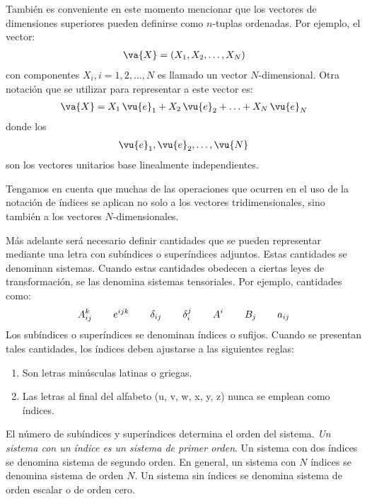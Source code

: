 \par
También es conveniente en este momento mencionar que los vectores de dimensiones superiores pueden definirse como $n$-tuplas ordenadas. Por ejemplo, el vector:
\begin{align*}
\va{X} = (X_{1}, X_{2}, \ldots, X_{N})
\end{align*}
con componentes $X_{i}, i =1, 2, \ldots, N$ es llamado un vector $N$-dimensional. Otra notación que se utilizar para representar a este vector es:
\begin{align*}
\va{X} = X_{1} \, \vu{e}_{1} +  X_{2} \, \vu{e}_{2} +  \ldots +  X_{N} \, \vu{e}_{N}
\end{align*}
donde los
\begin{align*}
\vu{e}_{1}, \vu{e}_{2}, \ldots, \vu{N}
\end{align*}
son los vectores unitarios base linealmente independientes.
\par
Tengamos en cuenta que muchas de las operaciones que ocurren en el uso de la notación de índices se aplican no solo a los vectores tridimensionales, sino también a los vectores $N$-dimensionales.
\par
Más adelante será necesario definir cantidades que se pueden representar mediante una letra con subíndices o superíndices adjuntos. Estas cantidades se denominan sistemas. Cuando estas cantidades obedecen a ciertas leyes de transformación, se las denomina sistemas tensoriales. Por ejemplo, cantidades como:
\begin{align*}
A_{ij}^{k} \hspace{0.75cm} e^{ijk} \hspace{0.75cm} \delta_{ij} \hspace{0.75cm} \delta_{i}^{j} \hspace{0.75cm} A^{i} \hspace{0.75cm} B_{j} \hspace{0.75cm} a_{ij}
\end{align*}
Los subíndices o superíndices se denominan índices o sufijos. Cuando se presentan tales cantidades, los índices deben ajustarse a las siguientes reglas:
\begin{enumerate}
\item Son letras minúsculas latinas o griegas.
\item Las letras al final del alfabeto (u, v, w, x, y, z) nunca se emplean como índices.
\end{enumerate}
El número de subíndices y superíndices determina el orden del sistema. \emph{Un sistema con un índice es un sistema de primer orden}. Un sistema con dos índices se denomina sistema de segundo orden. En general, un sistema con $N$ índices se denomina sistema de orden $N$. Un sistema sin índices se denomina sistema de orden escalar o de orden cero.
